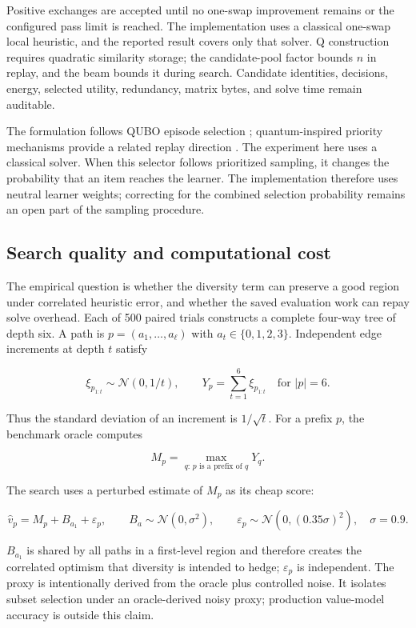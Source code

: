 \documentclass{strategynet-journal}
\begin{document}
Positive exchanges are accepted until no one-swap improvement remains or the
configured pass limit is reached.  The implementation uses a classical
one-swap local heuristic, and the reported result covers only that solver.
Q construction requires quadratic similarity
storage; the candidate-pool factor bounds $n$ in replay, and the beam bounds it
during search.  Candidate identities, decisions, energy, selected utility,
redundancy, matrix bytes, and solve time remain auditable.

The formulation follows QUBO episode selection \cite{quboepisodes};
quantum-inspired priority mechanisms provide a related replay direction
\cite{quantumreplay}.  The experiment here uses a classical solver.
When this selector follows prioritized sampling, it changes the probability
that an item reaches the learner. The implementation therefore uses neutral
learner weights; correcting for the combined selection probability remains
an open part of the sampling procedure.

\subsection{Search quality and computational cost}

The empirical question is whether the diversity term can preserve a good
region under correlated heuristic error, and whether the saved evaluation
work can repay solve overhead.  Each of 500 paired trials constructs a complete
four-way tree of depth six.  A path is
$p=(a_1,\ldots,a_\ell)$ with $a_t\in\{0,1,2,3\}$.  Independent edge increments
at depth $t$ satisfy

\[
 \xi_{p_{1:t}}\sim\mathcal{N}(0,1/t),
 \qquad
 Y_p=\sum_{t=1}^{6}\xi_{p_{1:t}}
 \quad\text{for }|p|=6 .
 \tag{10}
\]

Thus the standard deviation of an increment is $1/\sqrt{t}$.  For a
prefix $p$, the benchmark oracle computes

\[
 M_p=\max_{q:\,p\text{ is a prefix of }q}Y_q .
 \tag{11}
\]

The search uses a perturbed estimate of $M_p$ as its cheap score:

\[
 \widehat v_p=M_p+B_{a_1}+\varepsilon_p,
 \qquad
 B_a\sim\mathcal{N}(0,\sigma^2),
 \qquad
 \varepsilon_p\sim\mathcal{N}(0,(0.35\sigma)^2),
 \quad \sigma=0.9 .
 \tag{12}
\]

$B_{a_1}$ is shared by all paths in a first-level region and therefore creates
the correlated optimism that diversity is intended to hedge;
$\varepsilon_p$ is independent.  The proxy is intentionally derived from the
oracle plus controlled noise.  It isolates subset selection under an
oracle-derived noisy proxy; production value-model accuracy is outside this
claim.
\end{document}
